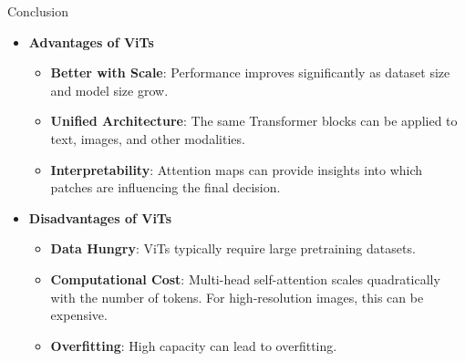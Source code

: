 \begin{frame}{Conclusion}
    \begin{itemize}
        \item \textbf{Advantages of ViTs}
        \begin{itemize}
            \item \textbf{Better with Scale}: Performance improves significantly as dataset size and model size grow.
            \item \textbf{Unified Architecture}: The same Transformer blocks can be applied to text, images, and other modalities.
            \item \textbf{Interpretability}: Attention maps can provide insights into which patches are influencing the final decision.
        \end{itemize}
        \item \textbf{Disadvantages of ViTs}
        \begin{itemize}
            \item \textbf{Data Hungry}: ViTs typically require large pretraining datasets.
            \item \textbf{Computational Cost}: Multi-head self-attention scales quadratically with the number of tokens. For high-resolution images, this can be expensive.
            \item \textbf{Overfitting}: High capacity can lead to overfitting.
        \end{itemize}
    \end{itemize}
\end{frame}

